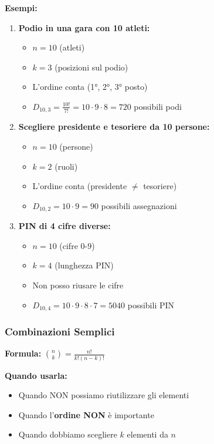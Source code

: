\textbf{Esempi:}
\begin{enumerate}
    \item \textbf{Podio in una gara con 10 atleti:}
    \begin{itemize}
        \item $n=10$ (atleti)
        \item $k=3$ (posizioni sul podio)
        \item L'ordine conta (1°, 2°, 3° posto)
        \item $D_{10,3} = \frac{10!}{7!} = 10 \cdot 9 \cdot 8 = 720$ possibili podi
    \end{itemize}

    \item \textbf{Scegliere presidente e tesoriere da 10 persone:}
    \begin{itemize}
        \item $n=10$ (persone)
        \item $k=2$ (ruoli)
        \item L'ordine conta (presidente $\neq$ tesoriere)
        \item $D_{10,2} = 10 \cdot 9 = 90$ possibili assegnazioni
    \end{itemize}

    \item \textbf{PIN di 4 cifre diverse:}
    \begin{itemize}
        \item $n=10$ (cifre 0-9)
        \item $k=4$ (lunghezza PIN)
        \item Non posso riusare le cifre
        \item $D_{10,4} = 10 \cdot 9 \cdot 8 \cdot 7 = 5040$ possibili PIN
    \end{itemize}
\end{enumerate}

\subsubsection{Combinazioni Semplici}
\textbf{Formula:} $\binom{n}{k} = \frac{n!}{k!(n-k)!}$

\textbf{Quando usarla:}
\begin{itemize}
    \item Quando NON possiamo riutilizzare gli elementi
    \item Quando l'\textbf{ordine NON} è importante
    \item Quando dobbiamo scegliere $k$ elementi da $n$
\end{itemize}

